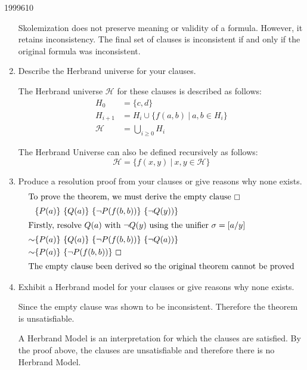 \documentclass[10pt,\jkfside,a4paper]{article}
\begin{document}
\begin{examquestion}{1999}{6}{10}
\begin{enumerate}
Skolemization does not preserve meaning or validity of a formula. However,
it retains inconsistency. The final set of clauses is inconsistent if
and only if the original formula was inconsistent.

\item Describe the Herbrand universe for your clauses.

The Herbrand universe $\mathcal{H}$ for these clauses is described
as follows:
\begin{align*}
H_0 &= \{c, d\} \\
H_{i+1} &= H_i \cup \{f(a, b) \ | \ a, b \in H_i\} \\
\mathcal{H} &= \bigcup_{i \geq 0} H_i
\end{align*}

The Herbrand Universe can also be defined recursively as follows:
\[
\mathcal{H} = \{f(x, y) \ | \ x, y \in \mathcal{H}\}
\]

\item Produce a resolution proof from your clauses or give reasons why none
exists.
\begin{align*}
\intertext{To prove the theorem, we must derive the empty clause $\boxempty$}
& \{P(a)\}\ \{Q(a)\}\ \{\neg P(f(b, b))\}\ \{\neg Q(y))\} \\
\intertext{Firstly, resolve $Q(a)$ with $\neg Q(y)$ using the unifier
$\sigma = [a/y]$}
\sim& \{P(a)\}\ \{Q(a)\}\ \{\neg P(f(b, b))\}\ \{\neg Q(a))\} \\
\sim& \{P(a)\}\ \{\neg P(f(b, b))\}\ \boxempty \\
\intertext{The empty clause been derived so the original theorem cannot be
proved}
\end{align*}
\item Exhibit a Herbrand model for your clauses or give reasons why none
exists.

Since the empty clause was shown to be inconsistent. Therefore the theorem
is unsatisfiable.

A Herbrand Model is an interpretation for which the clauses are satisfied.
By the proof above, the clauses are unsatisfiable and therefore there is no
Herbrand Model.

\end{enumerate}

\end{examquestion}
\end{document}

